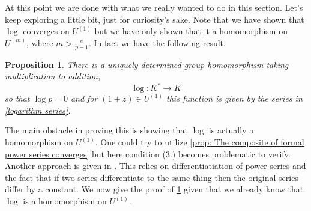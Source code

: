 \documentclass{article}
\newtheorem{proposition}{Proposition}[section]
\numberwithin{equation}{section}
\begin{document}
At this point we are done with what we really wanted to do in this section. Let's keep exploring a little bit, just for curiosity's sake. Note that we have shown that $\log$ converges on $U^{(1)}$ but we have only shown that it a homomorphism on $U^{(m)}$, where $m > \frac{e}{p-1}$. In fact we have the following result. 
\begin{proposition}\label{prop: Improved log}
    There is a uniquely determined group homomorphism taking multiplication to addition,
    $$\log : K^* \to K$$
    so that $\log p = 0$ and for $(1 + z) \in U^{(1)}$ this function is given by the series in \cref{logarithm series}.
\end{proposition}

The main obstacle in proving this is showing that $\log$ is actually a homomorphism on $U^{(1)}$. One could try to utilize \cref{prop: The composite of formal power series converges} but here condition (3.) becomes problematic to verify. Another approach is given in \citep[Proposition 5.7.3]{gouvea}. This relies on differentiatiation of power series and the fact that if two series differentiate to the same thing then the original series differ by a constant. We now give the proof of \cref{prop: Improved log} given that we already know that $\log$ is a homomorphism on $U^{(1)}$.
\end{document}
